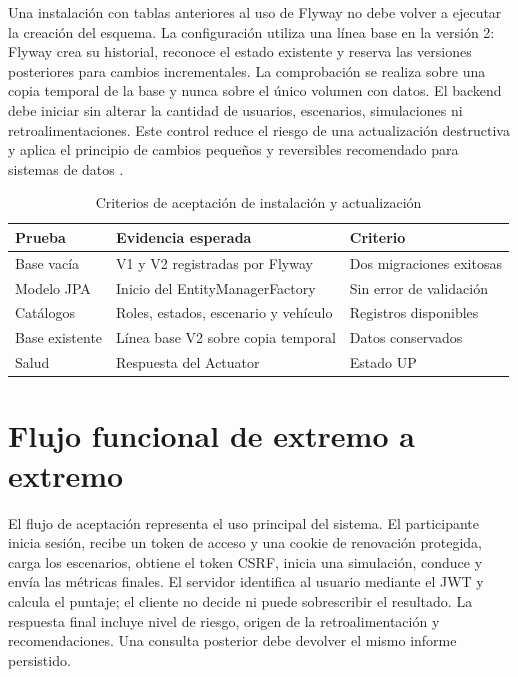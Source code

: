 \documentclass[11pt,a4paper]{report}
\begin{document}
Una instalación con tablas anteriores al uso de Flyway no debe volver a ejecutar
la creación del esquema. La configuración utiliza una línea base en la versión 2:
Flyway crea su historial, reconoce el estado existente y reserva las versiones
posteriores para cambios incrementales. La comprobación se realiza sobre una copia
temporal de la base y nunca sobre el único volumen con datos. El backend debe iniciar
sin alterar la cantidad de usuarios, escenarios, simulaciones ni retroalimentaciones.
Este control reduce el riesgo de una actualización destructiva y aplica el principio
de cambios pequeños y reversibles recomendado para sistemas de datos
\cite{kleppmann2017designing}.

\begin{table}[htbp]
\centering
\caption{Criterios de aceptación de instalación y actualización}
\begin{tabularx}{\textwidth}{p{3.1cm}X p{3.2cm}}
\toprule
\textbf{Prueba} & \textbf{Evidencia esperada} & \textbf{Criterio} \\
\midrule
Base vacía & V1 y V2 registradas por Flyway & Dos migraciones exitosas \\
Modelo JPA & Inicio del EntityManagerFactory & Sin error de validación \\
Catálogos & Roles, estados, escenario y vehículo & Registros disponibles \\
Base existente & Línea base V2 sobre copia temporal & Datos conservados \\
Salud & Respuesta del Actuator & Estado UP \\
\bottomrule
\end{tabularx}
\end{table}

\section{Flujo funcional de extremo a extremo}

El flujo de aceptación representa el uso principal del sistema. El participante
inicia sesión, recibe un token de acceso y una cookie de renovación protegida, carga
los escenarios, obtiene el token CSRF, inicia una simulación, conduce y envía las
métricas finales. El servidor identifica al usuario mediante el JWT y calcula el
puntaje; el cliente no decide ni puede sobrescribir el resultado. La respuesta final
incluye nivel de riesgo, origen de la retroalimentación y recomendaciones. Una
consulta posterior debe devolver el mismo informe persistido.
\end{document}
